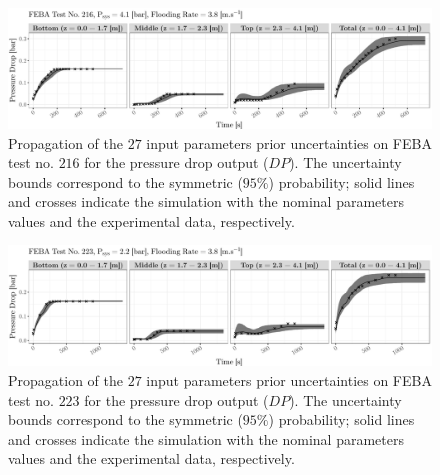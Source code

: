 \begin{figure}[bth]
    \centering
    \includegraphics[width=1.0\textwidth]{../figures/chapter2/figures/plotTraceUQPriorDP216}
    \caption[Propagation of the $27$ input parameters prior uncertainties on FEBA test no. $216$ for the pressure drop output ($DP$).]{Propagation of the $27$ input parameters prior uncertainties on FEBA test no. $216$ for the pressure drop output ($DP$). The uncertainty bounds correspond to the symmetric ($95\%$) probability; solid lines and crosses indicate the simulation with the nominal parameters values and the experimental data, respectively.}
    \label{fig:ch2_app_plot_trace_uq_prior_dp_216}
\end{figure}

\begin{figure}[!h]
    \centering
    \includegraphics[width=1.0\textwidth]{../figures/chapter2/figures/plotTraceUQPriorDP223}
    \caption[Propagation of the $27$ input parameters prior uncertainties on FEBA test no. $223$ for the pressure drop output ($DP$).]{Propagation of the $27$ input parameters prior uncertainties on FEBA test no. $223$ for the pressure drop output ($DP$). The uncertainty bounds correspond to the symmetric ($95\%$) probability; solid lines and crosses indicate the simulation with the nominal parameters values and the experimental data, respectively.}
    \label{fig:ch2_plot_trace_uq_prior_dp_223}
\end{figure}

\clearpage


